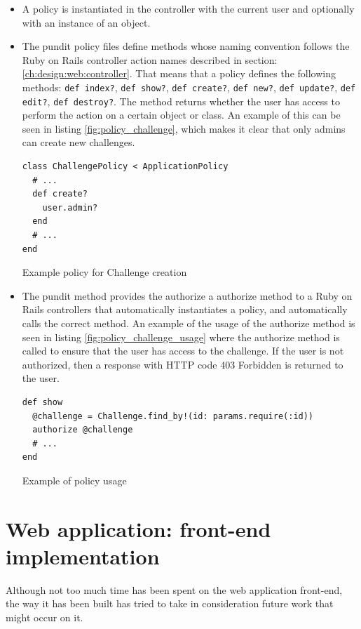 \begin{itemize}
    \item A policy is instantiated in the controller with the current user and optionally with an instance of an object.
    \item The pundit policy files define methods whose naming convention follows the Ruby on Rails controller action names described in section: \ref{ch:design:web:controller}. That means that a policy defines the following methods: \texttt{def index?}, \texttt{def show?}, \texttt{def create?}, \texttt{def new?}, \texttt{def update?}, \texttt{def edit?}, \texttt{def destroy?}. The method returns whether the user has access to perform the action on a certain object or class. An example of this can be seen in listing \ref{fig:policy_challenge}, which makes it clear that only admins can create new challenges.

\begin{code}
\begin{verbatim}
class ChallengePolicy < ApplicationPolicy
  # ...
  def create?
    user.admin?
  end
  # ...
end
\end{verbatim}
\caption{Example policy for Challenge creation}
\label{fig:policy_challenge}
\end{code}
    \item The pundit method provides the authorize a authorize method to a Ruby on Rails controllers that automatically instantiates a policy, and automatically calls the correct method. An example of the usage of the authorize method is seen in listing \ref{fig:policy_challenge_usage} where the authorize method is called to ensure that the user has access to the challenge. If the user is not authorized, then a response with HTTP code 403 Forbidden is returned to the user.
\begin{code}
\begin{verbatim}
def show
  @challenge = Challenge.find_by!(id: params.require(:id))
  authorize @challenge
  # ...
end
\end{verbatim}
\caption{Example of policy usage}
\label{fig:policy_challenge_usage}
\end{code}
\end{itemize}

\section{Web application: front-end implementation}
Although not too much time has been spent on the web application front-end, the way it has been built has tried to take in consideration future work that might occur on it. 

